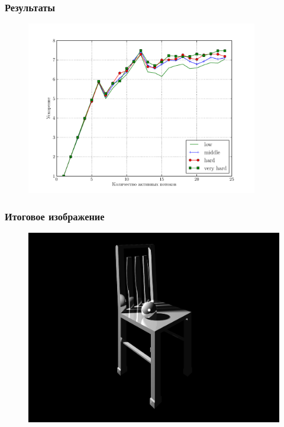 \documentclass[utf8, 12pt]{beamer}
\begin{document}
\begin{frame}
\frametitle{Результаты}
\begin{figure}[H]
\centering
\includegraphics[width=0.9\textwidth]{perf/table_perf_eff.pdf}
\end{figure}
\end{frame}

\begin{frame}
\frametitle{Итоговое изображение}
\begin{figure}[H]
\centering
\includegraphics[scale=0.16]{imgs/stulb.png}
\end{figure}

\end{frame}
\end{document}
